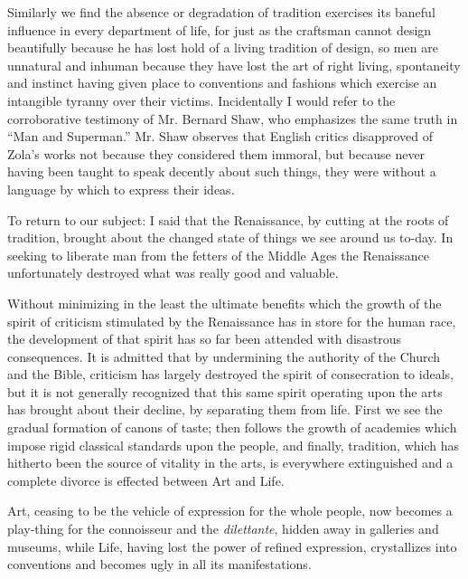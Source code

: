 \documentclass{book}
\begin{document}
Similarly we find the absence or degradation of tradition exercises its baneful influence in every department of life, for just as the craftsman cannot design beautifully because he has lost hold of a living tradition of design, so men are unnatural and inhuman because they have lost the art of right living, spontaneity and instinct having given place to conventions and fashions which exercise an intangible tyranny over their victims. Incidentally I would refer to the corroborative testimony of Mr. Bernard Shaw, who emphasizes the same truth in “Man and Superman.” Mr. Shaw observes that English critics disapproved of Zola’s works not because they considered them immoral, but because never having been taught to speak decently about such things, they were without a language by which to express their ideas.

To return to our subject: I said that the Renaissance, by cutting at the roots of tradition, brought about the changed state of things we see around us to-day. In seeking to liberate man from the fetters of the Middle Ages the Renaissance unfortunately destroyed what was really good and valuable.

Without minimizing in the least the ultimate benefits which the growth of the spirit of criticism stimulated by the Renaissance has in store for the human race, the development of that spirit has so far been attended with disastrous consequences. It is admitted that by undermining the authority of the Church and the Bible, criticism has largely destroyed the spirit of consecration to ideals, but it is not generally recognized that this same spirit operating upon the arts has brought about their decline, by separating them from life. First we see the gradual formation of canons of taste; then follows the growth of academies which impose rigid classical standards upon the people, and finally, tradition, which has hitherto been the source of vitality in the arts, is everywhere extinguished and a complete divorce is effected between Art and Life.

Art, ceasing to be the vehicle of expression for the whole people, now becomes a play-thing for the connoisseur and the \emph{dilettante}, hidden away in galleries and museums, while Life, having lost the power of refined expression, crystallizes into conventions and becomes ugly in all its manifestations.
\end{document}
